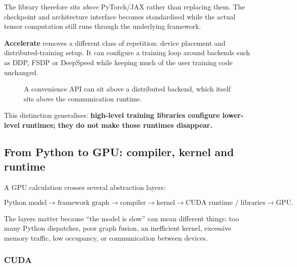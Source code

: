 The library therefore sits \emph{above} PyTorch/JAX rather than replacing them.
The checkpoint and architecture interface becomes standardised while the actual tensor computation still runs through the underlying framework.

\textbf{Accelerate} removes a different class of repetition: device placement and distributed-training setup.
It can configure a training loop around backends such as DDP, FSDP or DeepSpeed while keeping much of the user training code unchanged.

\begin{figure}[ht]
\centering
{}
\caption{A convenience API can sit above a distributed backend, which itself sits above the communication runtime.}
\label{fig:accelerate-stack}
\end{figure}

This distinction generalises: \textbf{high-level training libraries configure lower-level runtimes; they do not make those runtimes disappear.}


\subsection{From Python to GPU: compiler, kernel and runtime}

A GPU calculation crosses several abstraction layers:

\[
\text{Python model}
\rightarrow
\text{framework graph}
\rightarrow
\text{compiler}
\rightarrow
\text{kernel}
\rightarrow
\text{CUDA runtime / libraries}
\rightarrow
\text{GPU}.
\]

The layers matter because ``the model is slow'' can mean different things:
too many Python dispatches, poor graph fusion, an inefficient kernel, excessive memory traffic, low occupancy, or communication between devices.

\subsubsection*{CUDA}

